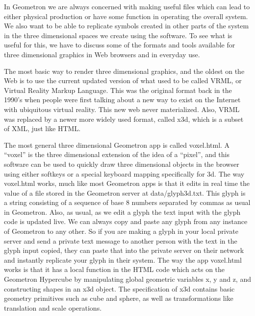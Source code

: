 In Geometron we are always concerned with making useful files which can lead to either physical production or have some function in operating the overall system.  We also want to be able to replicate symbols created in other parts of the system in the three dimensional spaces we create using the software.  To see what is useful for this, we have to discuss some of the formats and tools available for three dimensional graphics in Web browsers and in everyday use.  

The most basic way to render three dimensional graphics, and the oldest on the Web is to use the current updated version of what used to be called VRML, or Virtual Reality Markup Language.  This was the original format back in the 1990's when people were first talking about a new way to exist on the Internet with ubiquitous virtual reality.  This new web never materialized.  Also, VRML was replaced by a newer more widely used format, called x3d, which is a subset of XML, just like HTML.

The most general three dimensional Geometron app is called voxel.html.  A ``voxel'' is the three dimensional extension of the idea of a ``pixel'', and this software can be used to quickly draw three dimensional objects in the browser using either softkeys or a special keyboard mapping specifically for 3d.  The way voxel.html works, much like most Geometron apps is that it edits in real time the value of a file stored in the Geometron server at data/glyph3d.txt.  This glyph is a string consisting of a sequence of base 8 numbers separated by commas as usual in Geometron.  Also, as usual, as we edit a glyph the text input with the glyph code is updated live.  We can always copy and paste any glyph from any instance of Geometron to any other. So if you are making a glyph in your local private server and send a private text message to another person with the text in the glyph input copied, they can paste that into the private server on their network and instantly replicate your glyph in their system.  The way the app voxel.html works is that it has a local function in the HTML code which acts on the Geometron Hypercube by manipulating global geometric variables x, y and z, and constructing shapes in an x3d object.  The specification of x3d contains basic geometry primitives such as cube and sphere, as well as transformations like translation and scale operations.

